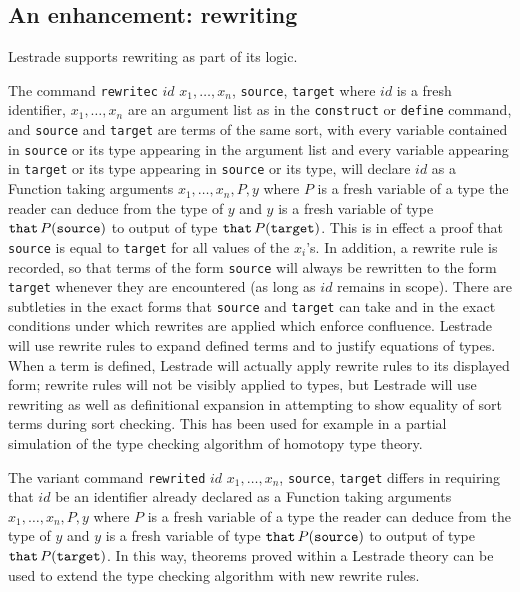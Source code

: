 \documentclass{article}
\begin{document}
\subsection{An enhancement: rewriting}

Lestrade supports rewriting as part of its logic.

The command {\tt rewritec} $id$ $x_1, \ldots, x_n$, {\tt source}, {\tt target}  where $id$ is a fresh identifier, $x_1, \ldots, x_n$ are an argument list as in the {\tt construct} or {\tt define} command, and {\tt source} and {\tt target} are terms of the same sort, with every variable contained in {\tt source} or its type appearing in the argument list and every variable appearing in {\tt target} or its type appearing in {\tt source} or its type, will declare $id$ as a Function taking arguments $x_1,\ldots,x_n,P,y$ where $P$ is a fresh variable of a type the reader can deduce from the type of $y$ and $y$ is a fresh variable of type
${\tt that} \,P({\tt source})$ to output of type ${\tt that}\, P({\tt target})$.  This is in effect a proof that {\tt source} is equal to {\tt target} for all values of the $x_i$'s.  In addition, a rewrite rule is recorded, so that terms of the form {\tt source} will always be rewritten to the form {\tt target} whenever they are encountered (as long as $id$ remains in scope).  There are subtleties in the exact forms that {\tt source} and {\tt target} can take and in the exact conditions under which rewrites are applied which enforce confluence.  Lestrade will use rewrite rules to expand defined terms and to justify equations of types.   When a term is defined, Lestrade will actually apply rewrite rules to its displayed form;  rewrite rules will not be visibly applied to types, but Lestrade will use rewriting as well as definitional expansion in attempting to show equality of sort terms during sort checking.   This has been used for example in a partial simulation of the type checking algorithm of homotopy type theory. 

The variant command  {\tt rewrited} $id$ $x_1, \ldots, x_n$, {\tt source}, {\tt target} differs in requiring that $id$ be an identifier already declared as a Function taking arguments $x_1,\ldots,x_n,P,y$ where $P$ is a fresh variable of a type the reader can deduce from the type of $y$ and $y$ is a fresh variable of type
${\tt that} \,P({\tt source})$ to output of type ${\tt that}\, P({\tt target})$.  In this way, theorems proved within a Lestrade theory can be used to extend the type checking algorithm with new rewrite rules.
\end{document}
